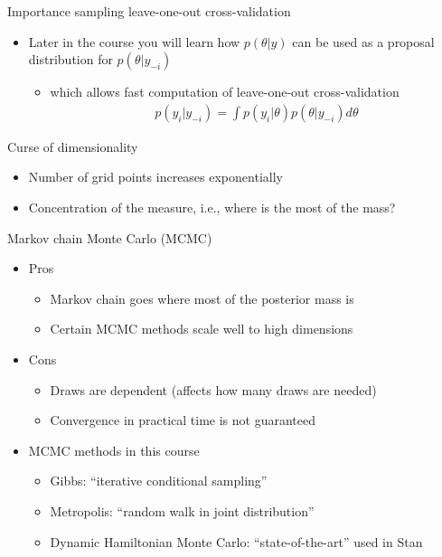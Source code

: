 \documentclass[finnish,english,t]{beamer}
\begin{document}
\begin{frame}{Importance sampling leave-one-out cross-validation}

  \begin{itemize}
  \item Later in the course you will learn how $p(\theta|y)$ can be
    used as a proposal distribution for $p(\theta|y_{-i})$
    \begin{itemize}
    \item which allows fast computation of leave-one-out cross-validation
      \begin{align*}
        p(y_i|y_{-i})=\int p(y_i|\theta) p(\theta|y_{-i}) d\theta
      \end{align*}
    \end{itemize}
  \end{itemize}

\end{frame}

\begin{frame}{Curse of dimensionality}

  \begin{itemize}
  \item Number of grid points increases exponentially
  \item Concentration of the measure, i.e., where is the most of the
    mass?
  \end{itemize}

\end{frame}

\begin{frame}{Markov chain Monte Carlo (MCMC)}

  \begin{itemize}
  \item Pros
    \begin{itemize}
    \item Markov chain goes where most of the posterior mass is
    \item Certain MCMC methods scale well to high dimensions
    \end{itemize}
  \item Cons
    \begin{itemize}
    \item Draws are dependent (affects how many draws are needed)
    \item Convergence in practical time is not guaranteed
    \end{itemize}
  \item MCMC methods in this course
    \begin{itemize}
    \item Gibbs: ``iterative conditional sampling''
    \item Metropolis: ``random walk in joint distribution''
    \item Dynamic Hamiltonian Monte Carlo: ``state-of-the-art'' used in Stan
    \end{itemize}
  \end{itemize}

\end{frame}
\end{document}
